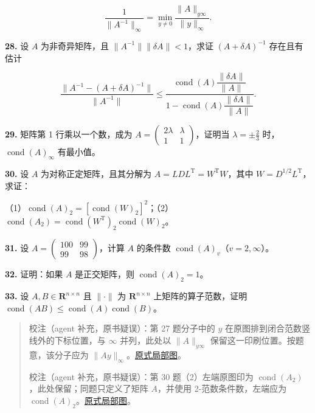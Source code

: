 \documentclass[
  10pt,
  fontset=fandol]{ctexart}
\begin{document}
\[
\frac1{\|A^{-1}\|_\infty}=\min_{y\neq0}\frac{\|A\|_{y\infty}}{\|y\|_\infty}.
\]

\textbf{28.} 设 \(A\) 为非奇异矩阵，且
\(\|A^{-1}\|\|\delta A\|<1\)，求证 \((A+\delta A)^{-1}\) 存在且有估计

\[
\frac{\|A^{-1}-(A+\delta A)^{-1}\|}{\|A^{-1}\|}
\leqslant
\frac{\operatorname{cond}(A)\dfrac{\|\delta A\|}{\|A\|}}
{1-\operatorname{cond}(A)\dfrac{\|\delta A\|}{\|A\|}}.
\]

\textbf{29.} 矩阵第 1 行乘以一个数，成为
\(A=\begin{pmatrix}2\lambda&\lambda\\1&1\end{pmatrix}\)，证明当
\(\lambda=\pm\frac23\) 时，\(\operatorname{cond}(A)_\infty\) 有最小值。

\textbf{30.} 设 \(A\) 为对称正定矩阵，且其分解为
\(A=LDL^{\mathrm T}=W^{\mathrm T}W\)，其中
\(W=D^{1/2}L^{\mathrm T}\)，求证：

（1）\(\operatorname{cond}(A)_2=[\operatorname{cond}(W)_2]^2\)；（2）\(\operatorname{cond}(A_2)=\operatorname{cond}(W^{\mathrm T})_2\operatorname{cond}(W)_2\)。

\textbf{31.} 设 \(A=\begin{pmatrix}100&99\\99&98\end{pmatrix}\)，计算
\(A\) 的条件数 \(\operatorname{cond}(A)_v\)（\(v=2,\infty\)）。

\textbf{32.} 证明：如果 \(A\) 是正交矩阵，则
\(\operatorname{cond}(A)_2=1\)。

\textbf{33.} 设 \(A,B\in\mathbf R^{n\times n}\) 且 \(\|\cdot\|\) 为
\(\mathbf R^{n\times n}\) 上矩阵的算子范数，证明
\(\operatorname{cond}(AB)\leqslant\operatorname{cond}(A)\operatorname{cond}(B)\)。

\begin{quote}
校注（agent 补充，原书疑误）：第 27 题分子中的 \(y\)
在原图排到闭合范数竖线外的下标位置，与 \(\infty\) 并列，此处以
\(\|A\|_{y\infty}\) 保留这一印刷位置。按题意，该分子应为
\(\|Ay\|_\infty\)。\href{../../../staging/ch07b/assets/214-ex27.png}{原式局部图}。

校注（agent 补充，原书疑误）：第 30 题（2）左端原图印为
\(\operatorname{cond}(A_2)\)，此处保留；同题只定义了矩阵 \(A\)，并使用
2-范数条件数，左端应为
\(\operatorname{cond}(A)_2\)。\href{../../../staging/ch07b/assets/214-ex30.png}{原式局部图}。
\end{quote}
\end{document}
